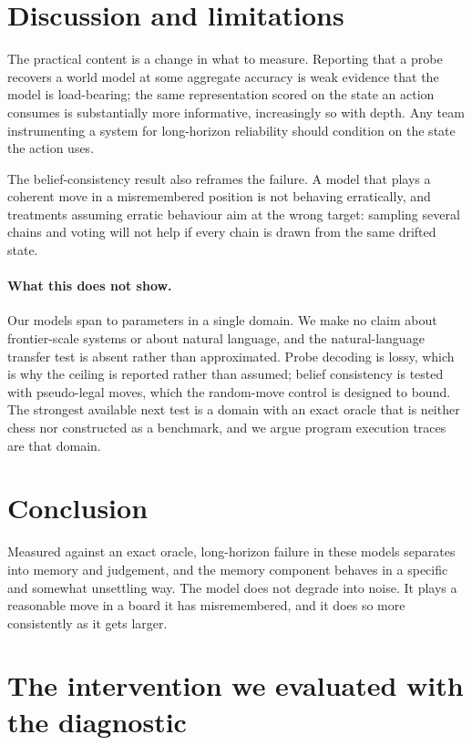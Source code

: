 \documentclass[10pt]{article}
\begin{document}
\section{Discussion and limitations}
\label{sec:limits}

The practical content is a change in what to measure. Reporting that a probe
recovers a world model at some aggregate accuracy is weak evidence that the model
is load-bearing; the same representation scored on the state an action consumes
is substantially more informative, increasingly so with depth. Any team
instrumenting a system for long-horizon reliability should condition on the state
the action uses.

The belief-consistency result also reframes the failure. A model that plays a
coherent move in a misremembered position is not behaving erratically, and
treatments assuming erratic behaviour aim at the wrong target: sampling several
chains and voting will not help if every chain is drawn from the same drifted
state.

\paragraph{What this does not show.} Our models span  to
 parameters in a single domain. We make no claim about
frontier-scale systems or about natural language, and the natural-language
transfer test is absent rather than approximated. Probe decoding is lossy, which
is why the ceiling is reported rather than assumed; belief consistency is tested
with pseudo-legal moves, which the random-move control is designed to bound. The
strongest available next test is a domain with an exact oracle that is neither
chess nor constructed as a benchmark, and we argue program execution traces are
that domain.

\section{Conclusion}

Measured against an exact oracle, long-horizon failure in these models separates
into memory and judgement, and the memory component behaves in a specific and
somewhat unsettling way. The model does not degrade into noise. It plays a
reasonable move in a board it has misremembered, and it does so more consistently
as it gets larger.


\appendix
\section{The intervention we evaluated with the diagnostic}
\label{app:alsb}
\end{document}

